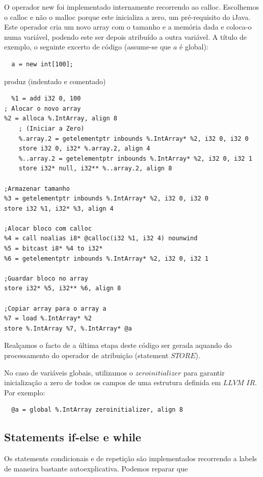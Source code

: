 \documentclass[11pt,a4paper]{article}
\begin{document}
O operador new foi implementado internamente recorrendo ao calloc. Escolhemos o calloc e não o malloc porque este inicializa a zero, um pré-requisito do iJava. Este operador cria um novo array com o tamanho e a memória dada e coloca-o numa variável, podendo este ser depois atribuído a outra variável. A título de exemplo, o seguinte excerto de código (assume-se que $a$ é global):

\begin{lstlisting}
  a = new int[100];
\end{lstlisting}

produz (indentado e comentado)

\begin{lstlisting}
  %1 = add i32 0, 100
; Alocar o novo array
%2 = alloca %.IntArray, align 8
    ; (Iniciar a Zero)
    %.array.2 = getelementptr inbounds %.IntArray* %2, i32 0, i32 0
    store i32 0, i32* %.array.2, align 4
    %..array.2 = getelementptr inbounds %.IntArray* %2, i32 0, i32 1
    store i32* null, i32** %..array.2, align 8

;Armazenar tamanho
%3 = getelementptr inbounds %.IntArray* %2, i32 0, i32 0
store i32 %1, i32* %3, align 4

;Alocar bloco com calloc
%4 = call noalias i8* @calloc(i32 %1, i32 4) nounwind
%5 = bitcast i8* %4 to i32* 
%6 = getelementptr inbounds %.IntArray* %2, i32 0, i32 1

;Guardar bloco no array
store i32* %5, i32** %6, align 8

;Copiar array para o array a
%7 = load %.IntArray* %2
store %.IntArray %7, %.IntArray* @a
\end{lstlisting}

Realçamos o facto de a última etapa deste código ser gerada aquando do processamento do operador de atribuição (statement $STORE$).

No caso de variáveis globais, utilizamos o $zeroinitializer$ para garantir inicialização a zero de todos os campos de uma estrutura definida em $LLVM$ $IR$. Por exemplo:

\begin{lstlisting}
  @a = global %.IntArray zeroinitializer, align 8
\end{lstlisting}

\subsection{Statements if-else e while}

Os statements condicionais e de repetição são implementados recorrendo a labels de maneira bastante autoexplicativa. Podemos reparar que
\end{document}
